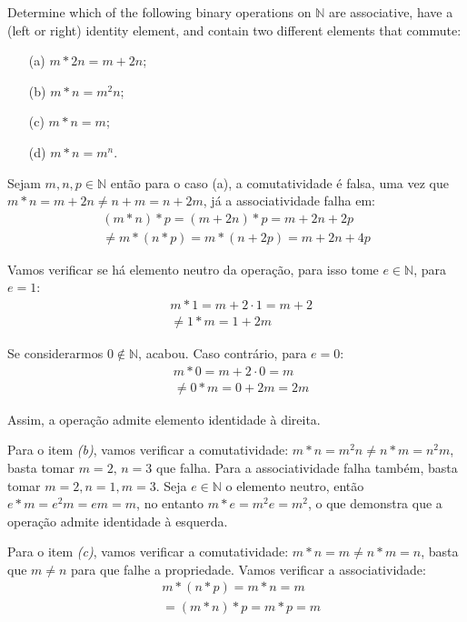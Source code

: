 \begin{exercicio}{1.18}
Determine which of the following binary operations on \(\mathbb{N}\) are associative, have a (left or right) identity element, and contain two different elements that commute:

\begin{itemize}
	\item[(a)] \(m * 2n = m + 2n\);
	\item[(b)] \(m * n = m^2 n\);
	\item[(c)] \(m * n = m\);
	\item[(d)] \(m * n = m^n\).
\end{itemize}
\end{exercicio}
\begin{solucao}
Sejam \(m,n,p \in \mathbb{N}\) então para o caso (a), a comutatividade é falsa, uma vez que \(m * n = m + 2n \neq n + m = n + 2m\), já a associatividade falha em:
\begin{align*}
		(m * n) * p = (m + 2n) * p = m + 2n + 2p\\
		\neq m * (n * p) = m * (n + 2p) = m + 2n + 4p
\end{align*}

Vamos verificar se há elemento neutro da operação, para isso tome $e \in \mathbb{N}$, para $e = 1$:
\begin{align*}
	&m * 1 = m + 2 \cdot 1 = m + 2 \\
	&\neq 1 * m = 1 + 2m
\end{align*}

Se considerarmos $0 \not \in \mathbb{N}$, acabou. Caso contrário, para $e = 0$:
\begin{align*}
	&m * 0 = m + 2 \cdot 0 = m \\
	&\neq 0 * m = 0 + 2m = 2m
\end{align*}

Assim, a operação admite elemento identidade à direita.

Para o item \textit{(b)}, vamos verificar a comutatividade: $m * n = m^2 n \neq n * m = n^2 m$, basta tomar $m = 2, \, n = 3$ que falha. Para a associatividade falha também, basta tomar $m = 2, n = 1, m = 3$. Seja $e \in \mathbb{N}$ o elemento neutro, então $e * m = e^2 m = em = m$, no entanto $m * e = m^2 e = m^2$, o que demonstra que a operação admite identidade à esquerda. 

Para o item \textit{(c)}, vamos verificar a comutatividade: $m * n = m \neq n * m = n$, basta que $m \neq n$ para que falhe a propriedade. Vamos verificar a associatividade:
\begin{align*}
	&m * (n * p) = m * n = m \\
	& = (m * n) * p = m * p = m \\
\end{align*}


\end{solucao}

